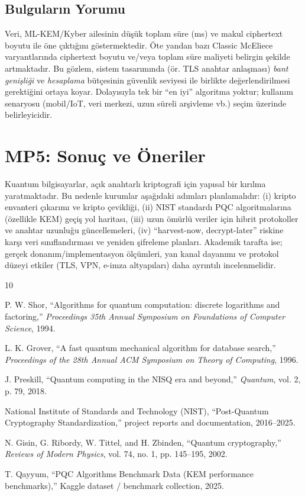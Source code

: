 \documentclass[conference]{IEEEtran}
\begin{document}
\subsection{Bulguların Yorumu}
Veri, ML-KEM/Kyber ailesinin düşük toplam süre (ms) ve makul ciphertext boyutu ile öne çıktığını göstermektedir.
Öte yandan bazı Classic McEliece varyantlarında ciphertext boyutu ve/veya toplam süre maliyeti belirgin şekilde artmaktadır.
Bu gözlem, sistem tasarımında (ör. TLS anahtar anlaşması) \emph{bant genişliği} ve \emph{hesaplama} bütçesinin güvenlik seviyesi ile birlikte değerlendirilmesi gerektiğini ortaya koyar.
Dolayısıyla tek bir ``en iyi'' algoritma yoktur; kullanım senaryosu (mobil/IoT, veri merkezi, uzun süreli arşivleme vb.) seçim üzerinde belirleyicidir.

\section{MP5: Sonuç ve Öneriler}
Kuantum bilgisayarlar, açık anahtarlı kriptografi için yapısal bir kırılma yaratmaktadır.
Bu nedenle kurumlar aşağıdaki adımları planlamalıdır:
(i) kripto envanteri çıkarımı ve kripto çevikliği,
(ii) NIST standardı PQC algoritmalarına (özellikle KEM) geçiş yol haritası,
(iii) uzun ömürlü veriler için hibrit protokoller ve anahtar uzunluğu güncellemeleri,
(iv) ``harvest-now, decrypt-later'' riskine karşı veri sınıflandırması ve yeniden şifreleme planları.
Akademik tarafta ise; gerçek donanım/implementasyon ölçümleri, yan kanal dayanımı ve protokol düzeyi etkiler (TLS, VPN, e-imza altyapıları) daha ayrıntılı incelenmelidir.

\begin{thebibliography}{10}

P. W. Shor, ``Algorithms for quantum computation: discrete logarithms and factoring,'' \emph{Proceedings 35th Annual Symposium on Foundations of Computer Science}, 1994.

L. K. Grover, ``A fast quantum mechanical algorithm for database search,'' \emph{Proceedings of the 28th Annual ACM Symposium on Theory of Computing}, 1996.

J. Preskill, ``Quantum computing in the NISQ era and beyond,'' \emph{Quantum}, vol. 2, p. 79, 2018.

National Institute of Standards and Technology (NIST), ``Post-Quantum Cryptography Standardization,'' project reports and documentation, 2016--2025.

N. Gisin, G. Ribordy, W. Tittel, and H. Zbinden, ``Quantum cryptography,'' \emph{Reviews of Modern Physics}, vol. 74, no. 1, pp. 145--195, 2002.

T. Qayyum, ``PQC Algorithms Benchmark Data (KEM performance benchmarks),'' Kaggle dataset / benchmark collection, 2025.

\end{thebibliography}
\end{document}
